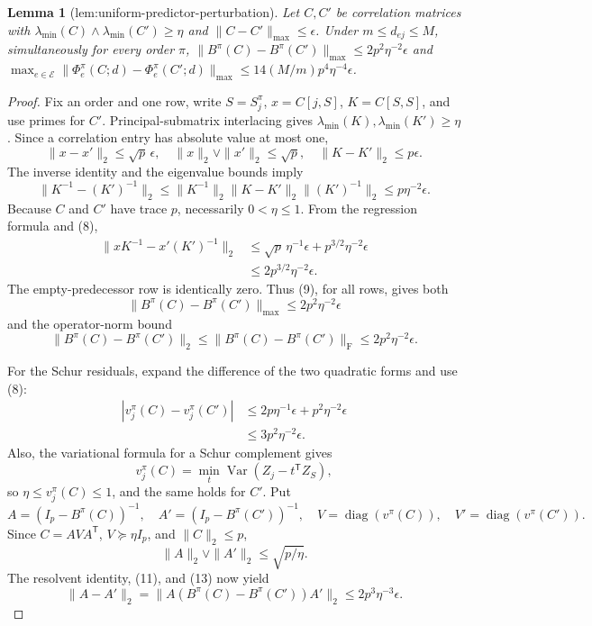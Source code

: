 \documentclass{article}
\newtheorem{lemma}{Lemma}
\begin{document}
\begin{lemma}[lem:uniform-predictor-perturbation]\label{lem:uniform-predictor-perturbation}
Let \(C,C'\) be correlation matrices with \(\lambda_{\min}(C)\wedge\lambda_{\min}(C')\ge\eta\) and \(\lVert C-C'\rVert_{\max}\le\epsilon\). Under \(m\le d_{ej}\le M\), simultaneously for every order \(\pi\), \(\lVert B^{\pi}(C)-B^{\pi}(C')\rVert_{\max}\le2p^2\eta^{-2}\epsilon\) and \(\max_{e\in\mathcal E}\lVert\Phi_e^{\pi}(C;d)-\Phi_e^{\pi}(C';d)\rVert_{\max}\le14(M/m)p^4\eta^{-4}\epsilon\).
\end{lemma}
\begin{proof}
Fix an order and one row, write \(S=S_j^\pi\), \(x=C[j,S]\), \(K=C[S,S]\), and use primes for \(C'\).  Principal-submatrix interlacing gives
\(\lambda_{\min}(K),\lambda_{\min}(K')\ge\eta\).  Since a correlation entry has absolute value at most one,
\[
 \|x-x'\|_2\le\sqrt p\,\epsilon,
 \quad \|x\|_2\vee\|x'\|_2\le\sqrt p,
 \quad \|K-K'\|_2\le p\epsilon.
\]
The inverse identity and the eigenvalue bounds imply
\[
 \|K^{-1}-(K')^{-1}\|_2
 \le\|K^{-1}\|_2\|K-K'\|_2\|(K')^{-1}\|_2
 \le p\eta^{-2}\epsilon. \tag{8}
\]
Because \(C\) and \(C'\) have trace \(p\), necessarily \(0<\eta\le1\).  From the regression formula and (8),
\[
 \begin{aligned}
 \|xK^{-1}-x'(K')^{-1}\|_2
 &\le \sqrt p\,\eta^{-1}\epsilon
       +p^{3/2}\eta^{-2}\epsilon\\
 &\le2p^{3/2}\eta^{-2}\epsilon.
 \end{aligned} \tag{9}
\]
The empty-predecessor row is identically zero.  Thus (9), for all rows, gives both
\[
 \|B^\pi(C)-B^\pi(C')\|_{\max}
 \le2p^2\eta^{-2}\epsilon \tag{10}
\]
and the operator-norm bound
\[
 \|B^\pi(C)-B^\pi(C')\|_2
 \le\|B^\pi(C)-B^\pi(C')\|_{\mathrm F}
 \le2p^2\eta^{-2}\epsilon. \tag{11}
\]

For the Schur residuals, expand the difference of the two quadratic forms and use (8):
\[
 \begin{aligned}
 |v_j^\pi(C)-v_j^\pi(C')|
 &\le 2p\eta^{-1}\epsilon+p^2\eta^{-2}\epsilon\\
 &\le3p^2\eta^{-2}\epsilon. 
 \end{aligned} \tag{12}
\]
Also, the variational formula for a Schur complement gives
\[
 v_j^\pi(C)=\min_t\operatorname{Var}(Z_j-t^{\mathsf T}Z_S),
\]
so \(\eta\le v_j^\pi(C)\le1\), and the same holds for \(C'\).  Put
\[
 A=(I_p-B^\pi(C))^{-1},\quad A'=(I_p-B^\pi(C'))^{-1},
 \quad V=\operatorname{diag}(v^\pi(C)),\quad V'=\operatorname{diag}(v^\pi(C')).
\]
Since \(C=AVA^{\mathsf T}\), \(V\succeq\eta I_p\), and \(\|C\|_2\le p\),
\[
 \|A\|_2\vee\|A'\|_2\le\sqrt{p/\eta}. \tag{13}
\]
The resolvent identity, (11), and (13) now yield
\[
 \|A-A'\|_2
 =\|A(B^\pi(C)-B^\pi(C'))A'\|_2
 \le2p^3\eta^{-3}\epsilon. \tag{14}
\]


\end{proof}
\end{document}
